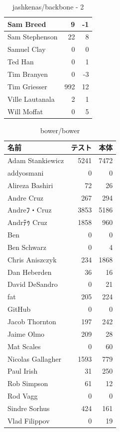 \begin{table}[htb]
\begin{center}
\caption{jashkenas/backbone - 2}
\begin{tabular}{|l|r|r|} \hline 
Sam Breed & 9 & -1\\ \hline
Sam Stephenson & 22 & 8\\ \hline
Samuel Clay & 0 & 0\\ \hline
Ted Han & 0 & 1\\ \hline
Tim Branyen & 0 & -3\\ \hline
Tim Griesser & 992 & 12\\ \hline
Ville Lautanala & 2 & 1\\ \hline
Will Moffat & 0 & 5\\ \hline
\end{tabular}
\end{center}
\end{table}

\begin{table}[htb]
\begin{center}
\caption{bower/bower}
\begin{tabular}{|l|r|r|} \hline 
名前 & テスト & 本体 \\ \hline \hline
Adam Stankiewicz & 5241 & 7472\\ \hline
addyosmani & 0 & 0\\ \hline
Alireza Bashiri & 72 & 26\\ \hline
Andre Cruz & 267 & 294\\ \hline
Andreﾌ・Cruz & 3853 & 5186\\ \hline
Andrﾃｩ Cruz & 1858 & 960\\ \hline
Ben & 0 & 0\\ \hline
Ben Schwarz & 0 & 4\\ \hline
Chris Aniszczyk & 234 & 1868\\ \hline
Dan Heberden & 36 & 16\\ \hline
David DeSandro & 0 & 21\\ \hline
fat & 205 & 224\\ \hline
GitHub & 0 & 0\\ \hline
Jacob Thornton & 197 & 242\\ \hline
Jaime Olmo & 209 & 28\\ \hline
Mat Scales & 0 & 60\\ \hline
Nicolas Gallagher & 1593 & 779\\ \hline
Paul Irish & 31 & 250\\ \hline
Rob Simpson & 61 & 12\\ \hline
Rod Vagg & 0 & 0\\ \hline
Sindre Sorhus & 424 & 161\\ \hline
Vlad Filippov & 0 & 19\\ \hline
\end{tabular}
\end{center}
\end{table}

